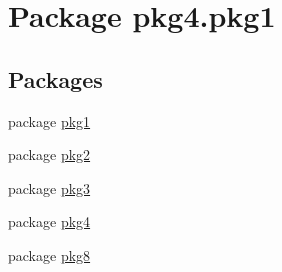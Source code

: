 \hypertarget{namespacepkg4_1_1pkg1}{}\section{Package pkg4.\+pkg1}
\label{namespacepkg4_1_1pkg1}
\subsection*{Packages}
\begin{DoxyCompactItemize}
\item 
package \mbox{\hyperlink{namespacepkg4_1_1pkg1_1_1pkg1}{pkg1}}
\item 
package \mbox{\hyperlink{namespacepkg4_1_1pkg1_1_1pkg2}{pkg2}}
\item 
package \mbox{\hyperlink{namespacepkg4_1_1pkg1_1_1pkg3}{pkg3}}
\item 
package \mbox{\hyperlink{namespacepkg4_1_1pkg1_1_1pkg4}{pkg4}}
\item 
package \mbox{\hyperlink{namespacepkg4_1_1pkg1_1_1pkg8}{pkg8}}
\end{DoxyCompactItemize}

